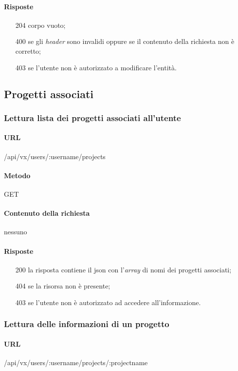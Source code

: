 \paragraph{Risposte}
\begin{itemize}
	\item[204] corpo vuoto;
	\item[400] se gli \emph{header} sono invalidi oppure se il contenuto della richiesta non è corretto;
	\item[403] se l'utente non è autorizzato a modificare l'entità.
\end{itemize}

\subsection{Progetti associati}

\subsubsection{Lettura lista dei progetti associati all'utente}
\paragraph{URL}
/api/vx/users/:username/projects
\paragraph{Metodo}
GET
\paragraph{Contenuto della richiesta}
nessuno
\paragraph{Risposte}
\begin{itemize}
	\item[200] la risposta contiene il \gls{json} con l'\emph{array} di nomi dei progetti associati;
	\item[404] se la risorsa non è presente;
	\item[403] se l'utente non è autorizzato ad accedere all'informazione.
\end{itemize}

\subsubsection{Lettura delle informazioni di un progetto}
\paragraph{URL}
/api/vx/users/:username/projects/:projectname
